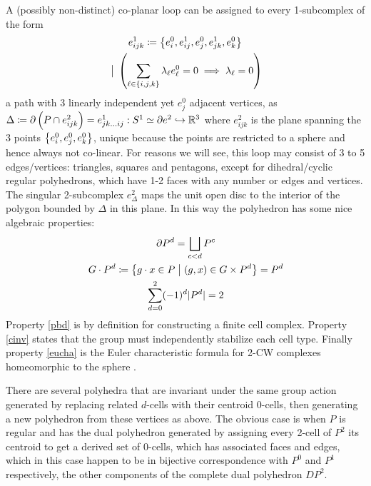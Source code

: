 \documentclass{amsart}
\theoremstyle{plain}
\theoremstyle{definition}
\begin{document}
A (possibly non-distinct) co-planar loop can be assigned to every 1-subcomplex of the form
\begin{gather*}
    e^1_{ijk}\coloneqq\left\{e^0_i,e^1_{ij}, e^0_j, e^1_{jk}, e^0_k\right\}\\
    \hspace{1mm}\big|\hspace{1mm} \left(\sum_{\ell\in \left\{i,j,k\right\}}\lambda_\ell e^0_\ell = 0\implies \lambda_\ell = 0\right)
\end{gather*}
a path with 3 linearly independent yet $e^0_j$ adjacent vertices, as $\Delta\coloneqq\partial\left(P\cap e^2_{ijk}\right)=e^1_{jk\dots ij}: S^1\simeq\partial e^2\hookrightarrow \mathbb{R}^3$ where $e^2_{ijk}$ is the plane spanning the 3 points $\left\{e^0_i,e^0_j,e^0_k\right\}$, unique because the points are restricted to a sphere and hence always not co-linear. For reasons we will see, this loop may consist of 3 to 5 edges/vertices: triangles, squares and pentagons, except for dihedral/cyclic regular polyhedrons, which have 1-2 faces with any number or edges and vertices. The singular 2-subcomplex  $e^2_{\Delta}$ maps the unit open disc to the interior of the polygon bounded by $\Delta$ in this plane.
In this way the polyhedron has some nice algebraic properties:
\begin{gather}
    \partial P^d = \bigsqcup_{c<d}P^c\label{pbd}\\
    G\cdot P^d\coloneqq\left\{g\cdot x\in P\hspace{1mm}\big|\hspace{1mm} (g,x)\in G\times P^d\right\}=P^d\label{cinv}\\
    \sum_{d=0}^2(-1)^d|P^d|=2\label{eucha}
\end{gather}
 Property \ref{pbd} is by definition for constructing a finite cell complex. Property \ref{cinv} states that the group must independently stabilize each cell type. Finally property \ref{eucha} is the Euler characteristic formula for 2-CW complexes homeomorphic to the sphere \cite{MR1867354}.

 There are several polyhedra that are invariant under the same group action generated by replacing related $d$-cells with their centroid $0$-cells, then generating a new polyhedron from these vertices as above. The obvious case is when $P$ is regular and has the dual polyhedron generated by assigning every 2-cell of $P^2$ its centroid to get a derived set of 0-cells, which has associated faces and edges, which in this case happen to be in bijective correspondence with $P^0$ and $P^1$ respectively, the other components of the complete dual polyhedron $DP^2$.
\end{document}
